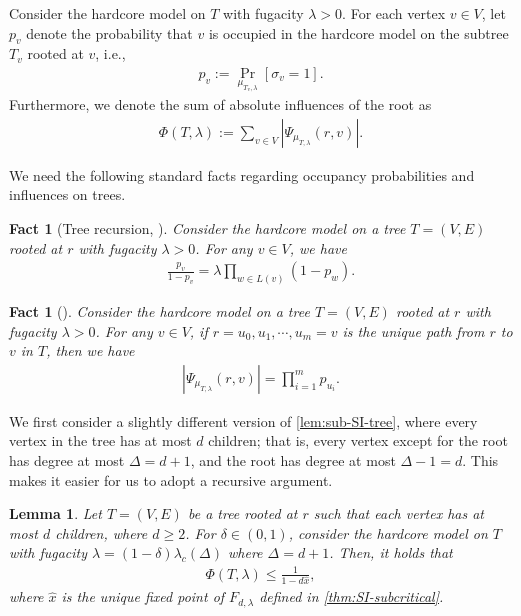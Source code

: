 \documentclass[11pt]{article}
\theoremstyle{plain}
\newtheorem{lemma}[theorem]{Lemma}
\newtheorem{fact}[theorem]{Fact}
\theoremstyle{definition}
\theoremstyle{remark}
\def\oPr{\mathop{\mathrm{Pr}}}
\renewcommand{\Pr}[2][]{
  \oPr_{#1}\left[#2\right] } %
\begin{document}
Consider the hardcore model on $T$ with fugacity $\lambda>0$.
For each vertex $v \in V$, let $p_v$ denote the probability that $v$ is occupied in the hardcore model on the subtree $T_v$ rooted at $v$, i.e., 
\begin{align*}
	p_v := \Pr[\mu_{T_v,\lambda}]{\sigma_v = 1}.
\end{align*}
Furthermore, we denote the sum of absolute influences of the root as
\begin{align*}
	\Phi(T,\lambda) := \sum_{v \in V} \left| \Psi_{\mu_{T,\lambda}}(r,v) \right|.
\end{align*}

We need the following standard facts regarding occupancy probabilities and influences on trees.
\begin{fact}[Tree recursion, \cite{weitz2006counting}]
	\label{fact:tree-recursion}
	Consider the hardcore model on a tree $T=(V,E)$ rooted at $r$ with fugacity $\lambda>0$.
	For any $v\in V$, we have
	\begin{align*}
		\frac{p_v}{1-p_v} = \lambda \prod_{w\in L(v)} (1-p_w).
	\end{align*}
\end{fact}

\begin{fact}[\cite{chen2023rapid}]
	\label{fact:prod}
	Consider the hardcore model on a tree $T=(V,E)$ rooted at $r$ with fugacity $\lambda>0$.
	For any $v\in V$, if $r=u_0,u_1,\cdots,u_m=v$ is the unique path from $r$ to $v$ in $T$, then we have
	\begin{align*}
		\left| \Psi_{\mu_{T,\lambda}}(r,v) \right| = \prod_{i=1}^m p_{u_i}.
	\end{align*}
\end{fact}


We first consider a slightly different version of \cref{lem:sub-SI-tree}, where every vertex in the tree has at most $d$ children; that is, every vertex except for the root has degree at most $\Delta=d+1$, and the root has degree at most $\Delta-1=d$.
This makes it easier for us to adopt a recursive argument.

\begin{lemma}\label{lem:sub-tree-SI}
	Let $T=(V,E)$ be a tree rooted at $r$ such that each vertex has at most $d$ children, where $d \ge 2$. 
	For $\delta\in (0,1)$, consider the hardcore model on $T$ with fugacity $\lambda = (1-\delta) \lambda_c(\Delta)$ where $\Delta = d+1$. 
	Then, it holds that
	\begin{align*}
		\Phi(T,\lambda)
		\le \frac{1}{1-d\hat x},
	\end{align*}
	where $\hat{x}$ is the unique fixed point of $F_{d,\lambda}$ defined in \cref{thm:SI-subcritical}.
\end{lemma}
\end{document}
